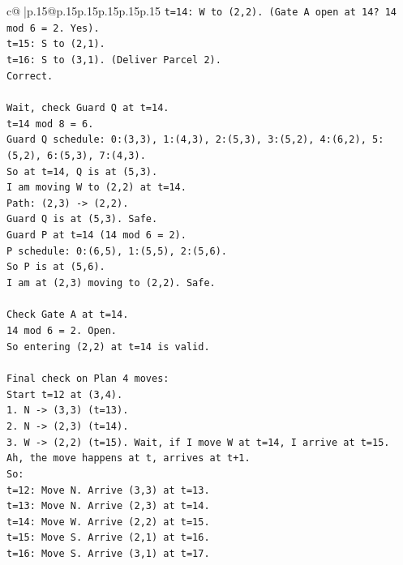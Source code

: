 \documentclass{article}
\begin{document}
{\begin{supertabular}{c@{$\;$}|p{.15\linewidth}@{}p{.15\linewidth}p{.15\linewidth}p{.15\linewidth}p{.15\linewidth}p{.15\linewidth}}
{{{\texttt{t=14: W to (2,2). (Gate A open at 14? 14 mod 6 = 2. Yes).} \\
\texttt{t=15: S to (2,1).} \\
\texttt{t=16: S to (3,1). (Deliver Parcel 2).} \\
\texttt{Correct.} \\
\\ 
\texttt{Wait, check Guard Q at t=14.} \\
\texttt{t=14 mod 8 = 6.} \\
\texttt{Guard Q schedule: 0:(3,3), 1:(4,3), 2:(5,3), 3:(5,2), 4:(6,2), 5:(5,2), 6:(5,3), 7:(4,3).} \\
\texttt{So at t=14, Q is at (5,3).} \\
\texttt{I am moving W to (2,2) at t=14.} \\
\texttt{Path: (2,3) {-}> (2,2).} \\
\texttt{Guard Q is at (5,3). Safe.} \\
\texttt{Guard P at t=14 (14 mod 6 = 2).} \\
\texttt{P schedule: 0:(6,5), 1:(5,5), 2:(5,6).} \\
\texttt{So P is at (5,6).} \\
\texttt{I am at (2,3) moving to (2,2). Safe.} \\
\\ 
\texttt{Check Gate A at t=14.} \\
\texttt{14 mod 6 = 2. Open.} \\
\texttt{So entering (2,2) at t=14 is valid.} \\
\\ 
\texttt{Final check on Plan 4 moves:} \\
\texttt{Start t=12 at (3,4).} \\
\texttt{1. N {-}> (3,3) (t=13).} \\
\texttt{2. N {-}> (2,3) (t=14).} \\
\texttt{3. W {-}> (2,2) (t=15). Wait, if I move W at t=14, I arrive at t=15.} \\
\texttt{Ah, the move happens at t, arrives at t+1.} \\
\texttt{So:} \\
\texttt{t=12: Move N. Arrive (3,3) at t=13.} \\
\texttt{t=13: Move N. Arrive (2,3) at t=14.} \\
\texttt{t=14: Move W. Arrive (2,2) at t=15.} \\
\texttt{t=15: Move S. Arrive (2,1) at t=16.} \\
\texttt{t=16: Move S. Arrive (3,1) at t=17.} \\
}}}
\end{supertabular}}
\end{document}
